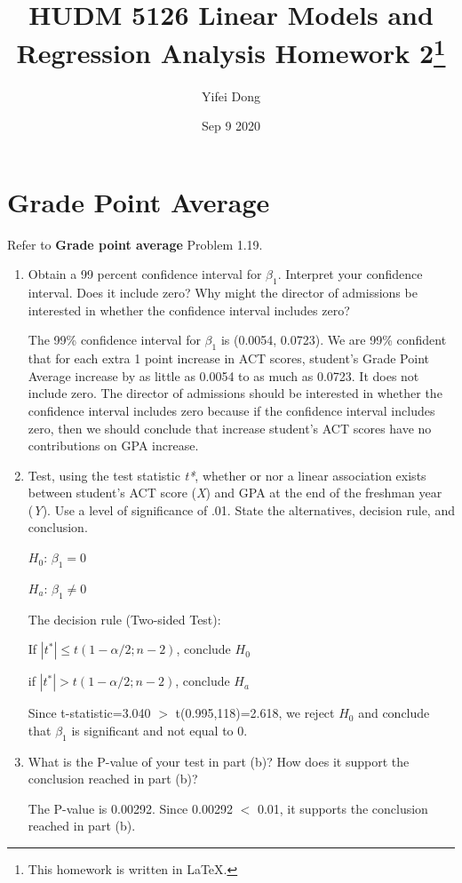 \documentclass{article}
\title{HUDM 5126 Linear Models and Regression Analysis Homework 2\footnote{This homework is written in \LaTeX.}}
\author{Yifei Dong}
\date{Sep 9 2020}
\begin{document}
\maketitle
\section{Grade Point Average}
 Refer to \textbf{Grade point average} Problem 1.19.

\begin{enumerate}[label=(\alph*)]
\item Obtain a 99 percent confidence interval for $\beta_{1}$. Interpret your confidence interval. Does it include zero? Why might the director of admissions be interested in whether the confidence interval includes zero?

The 99\% confidence interval for $\beta_{1}$ is (0.0054, 0.0723). We are 99\% confident that for each extra 1 point increase in ACT scores, student's Grade Point Average increase by as little as 0.0054 to as much as 0.0723. It does not include zero. The director of admissions should be interested in whether the confidence interval includes zero because if the confidence interval includes zero, then we should conclude that increase student's ACT scores have no contributions on GPA increase.

\item Test, using the test statistic \emph{t*}, whether or nor a linear association exists between student's ACT score (\emph{X}) and GPA at the end of the freshman year (\emph{Y}). Use a level of significance of .01. State the alternatives, decision rule, and conclusion.

\begin{center}
$H_{0}$: $\beta_{1}=0$

$H_{a}$: $\beta_{1} \neq 0$
\end{center}

The decision rule (Two-sided Test): 

\begin{center}
If $|t^*| \leq t(1-\alpha/2; n-2)$, conclude $H_{0}$

if $|t^*|> t(1-\alpha/2; n-2)$, conclude $H_{a}$
\end{center}

Since t-statistic=3.040 $>$ t(0.995,118)=2.618, we reject $H_{0}$ and conclude that $\beta_{1}$ is significant and not equal to 0.

\item What is the P-value of your test in part (b)? How does it support the conclusion reached in part (b)?

The P-value is 0.00292. Since 0.00292 $<$ 0.01, it supports the conclusion reached in part (b).

\end{enumerate}
\end{document}
